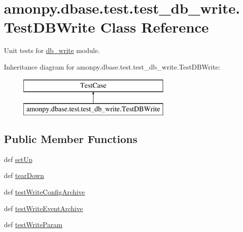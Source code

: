 \hypertarget{classamonpy_1_1dbase_1_1test_1_1test__db__write_1_1_test_d_b_write}{\section{amonpy.\-dbase.\-test.\-test\-\_\-db\-\_\-write.\-Test\-D\-B\-Write Class Reference}
\label{classamonpy_1_1dbase_1_1test_1_1test__db__write_1_1_test_d_b_write}
}


Unit tests for \hyperlink{namespaceamonpy_1_1dbase_1_1db__write}{db\-\_\-write} module.  


Inheritance diagram for amonpy.\-dbase.\-test.\-test\-\_\-db\-\_\-write.\-Test\-D\-B\-Write\-:\begin{figure}[H]
\begin{center}
\leavevmode
\includegraphics[height=2.000000cm]{db/d42/classamonpy_1_1dbase_1_1test_1_1test__db__write_1_1_test_d_b_write}
\end{center}
\end{figure}
\subsection*{Public Member Functions}
\begin{DoxyCompactItemize}
\item 
def \hyperlink{classamonpy_1_1dbase_1_1test_1_1test__db__write_1_1_test_d_b_write_a8ef76286fea5446138811375fb7f66b5}{set\-Up}
\item 
def \hyperlink{classamonpy_1_1dbase_1_1test_1_1test__db__write_1_1_test_d_b_write_aa32d3bef1374ed78d24d9576db67efab}{tear\-Down}
\item 
def \hyperlink{classamonpy_1_1dbase_1_1test_1_1test__db__write_1_1_test_d_b_write_a8f1e78ed7fb69e2163ad947a634d4326}{test\-Write\-Config\-Archive}
\item 
def \hyperlink{classamonpy_1_1dbase_1_1test_1_1test__db__write_1_1_test_d_b_write_a894227c7d803e8555a9a979731afd2d7}{test\-Write\-Event\-Archive}
\item 
def \hyperlink{classamonpy_1_1dbase_1_1test_1_1test__db__write_1_1_test_d_b_write_adc4ec167459df746be42a7a073a51d48}{test\-Write\-Param}
\end{DoxyCompactItemize}
